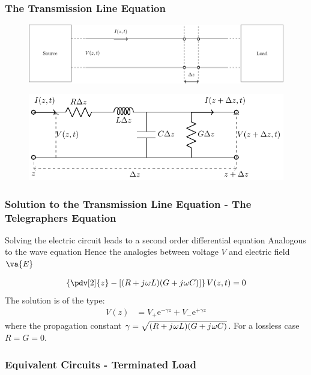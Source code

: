 \documentclass[10pt, compress]{beamer}
\renewcommand{\O}{\omega}  %
\newcommand{\e}{\mathrm{e}} %
\renewcommand{\j}{{j}\mkern1mu} %
\begin{document}
\begin{frame}
  \frametitle{The Transmission Line Equation}

\begin{figure}
  \centering
  \includegraphics[width=.85\textwidth]{tlines.pdf}
  \end{figure}
  \begin{figure}
    \centering
    \includegraphics[width=.85\textwidth]{circuit2.pdf}
      \end{figure}
\end{frame}

\begin{frame}
  \frametitle{Solution to the Transmission Line Equation - The Telegraphers Equation}
\begin{outline}
  \1 Solving the electric circuit leads to a second order differential equation
  \1 Analogous to the wave equation
  \2 Hence the analogies between voltage $V$ and electric field $\va{E}$
\end{outline}
\begin{align*}
  \left\{ \pdv[2]{z} - \left[ (R + \j \O L)( G + \j \O C)  \right] \right\} V (z,t) = 0
\end{align*}
The solution is of the type:
\begin{align*}
  V(z) &= V_{+} \e^{-\gamma z} + V_{-} \e^{+\gamma z}
\end{align*}
where the propagation constant $\gamma = \sqrt{(R + \j \O L)( G + \j \O C)}$. For a lossless case $R = G = 0$. 
\end{frame}

\begin{frame}
  \frametitle{Equivalent Circuits - Terminated Load}
\begin{outline}
  \1 
\end{outline}

  

\end{frame}
\end{document}

